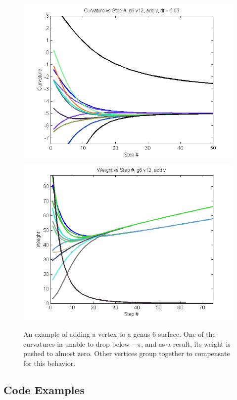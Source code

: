\documentclass[12pt]{article}
\begin{document}
\begin{figure}
\begin{center}
\includegraphics[scale = 0.8]{Pictures/Curvg6v12addv.png}
\includegraphics[scale = 0.8]{Pictures/Weightg6v12addv.png}
\caption{An example of adding a vertex to a genus 6 surface. One of the curvatures in unable to drop below $-\pi$, and as a result, its weight is pushed to almost zero. Other vertices group together to compensate for this behavior.}
\end{center}
\end{figure}

\subsection{Code Examples}
\end{document}
